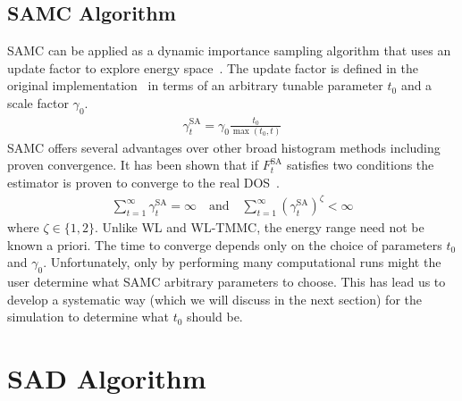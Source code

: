 \documentclass[letterpaper,twocolumn,amsmath,amssymb,pre,aps,10pt]{revtex4-1}
\begin{document}
\subsection{SAMC Algorithm}
SAMC can be applied as a dynamic importance sampling algorithm that
uses an update factor to explore energy
space~\cite{liang2007stochastic, werlich2015stochastic,
schneider2017convergence}.  The update factor is defined in the
original implementation~\cite{liang2007stochastic} in terms of an
arbitrary tunable parameter $t_0$ and a scale factor $\gamma_0$.
\begin{align}
\gamma_{t}^{\text{SA}} =\gamma_0 \frac{t_0}{\max(t_0,t)}
\end{align}
SAMC offers several advantages over other broad histogram methods
including proven convergence. It has been shown that if
$F_{t}^{\text{SA}}$ satisfies two conditions the estimator is proven to
converge to the real DOS~\cite{liang2006theory, liang2007stochastic}.
\begin{align}
\sum_{t=1}^\infty \gamma_{t}^{\text{SA}} = \infty \quad\textrm{and}\quad
\sum_{t=1}^\infty (\gamma_{t}^{\text{SA}})^\zeta < \infty
\end{align}
where $\zeta \in \{1,2\}$.  Unlike WL and WL-TMMC, the energy range need
not be known a priori.  The time to converge depends only on the choice of
parameters $t_0$ and $\gamma_0$.
Unfortunately, only by performing many computational runs might the user
determine what SAMC arbitrary parameters to choose.  This has lead us
to develop a systematic way (which we will discuss in the next section)
for the simulation to determine what $t_0$ should be.

\section{SAD Algorithm}
\end{document}

